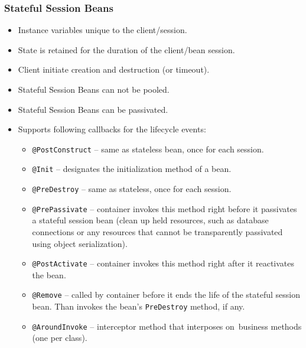 \documentclass[10pt,xcolor=pdflatex]{beamer}
\begin{document}
\begin{frame}\frametitle{Stateful Session Beans}
	\begin{itemize}
		\item Instance variables unique to the client/session.
		\item State is retained for the duration of the client/bean session.
		\item Client initiate creation and destruction (or timeout).
		\item Stateful Session Beans can not be pooled.
		\item Stateful Session Beans can be passivated.
		\item Supports following callbacks for the lifecycle events:
          \begin{itemize}
            \item \texttt{@PostConstruct} -- same as stateless bean, once for each session.
        	\item \texttt{@Init} -- designates the initialization method of a bean.
        	\item \texttt{@PreDestroy} -- same as stateless, once for each session.
        	\item \texttt{@PrePassivate} -- container invokes this method right before it passivates a stateful session bean (clean up held resources, such as database connections or any resources that cannot be transparently passivated using object serialization).
        	\item \texttt{@PostActivate} -- container invokes this method right after it reactivates the bean.
        	\item \texttt{@Remove} -- called by container before it ends the life of the stateful session bean. Than invokes the bean’s \texttt{PreDestroy} method, if any.
            \item \texttt{@AroundInvoke} -- interceptor method that interposes on~business methods (one per class).
          \end{itemize}
	\end{itemize}
\end{frame}
\end{document}
